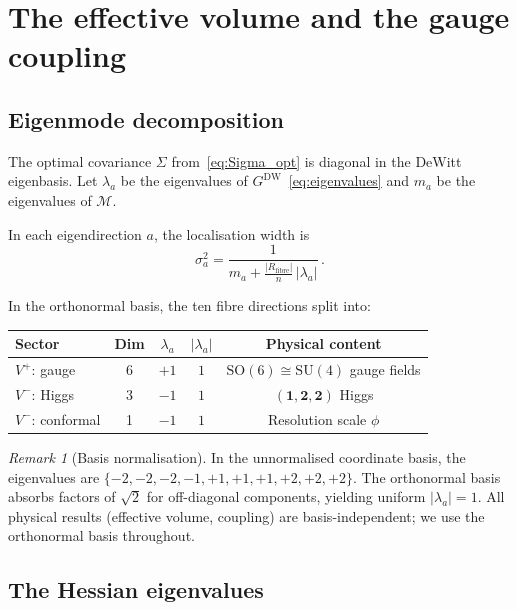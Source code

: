 \documentclass[12pt, a4paper]{article}
\theoremstyle{definition}
\theoremstyle{remark}
\newtheorem{remark}[theorem]{Remark}
\newcommand{\SU}{\mathrm{SU}}
\newcommand{\SO}{\mathrm{SO}}
\newcommand{\Rfibre}{R_{\mathrm{fibre}}}
\begin{document}
\section{The effective volume and the gauge coupling}
\label{sec:coupling}

\subsection{Eigenmode decomposition}

The optimal covariance $\Sigma$ from~\eqref{eq:Sigma_opt} is diagonal in the DeWitt eigenbasis.
Let $\lambda_a$ be the eigenvalues of $G^{\mathrm{DW}}$~\eqref{eq:eigenvalues} and $m_a$ be the eigenvalues of $\mathcal{M}$.

In each eigendirection $a$, the localisation width is
\begin{equation}
\label{eq:sigma_a}
\sigma_a^2 = \frac{1}{m_a + \frac{|\Rfibre|}{n}\, |\lambda_a|}\,.
\end{equation}

In the orthonormal basis, the ten fibre directions split into:
\begin{center}
\renewcommand{\arraystretch}{1.3}
\begin{tabular}{lcccc}
\toprule
\textbf{Sector} & \textbf{Dim} & $\lambda_a$ & $|\lambda_a|$ & \textbf{Physical content} \\
\midrule
$V^+$: gauge & 6 & $+1$ & $1$ & $\SO(6) \cong \SU(4)$ gauge fields \\
$V^-$: Higgs & 3 & $-1$ & $1$ & $(\mathbf{1},\mathbf{2},\mathbf{2})$ Higgs \\
$V^-$: conformal & 1 & $-1$ & $1$ & Resolution scale $\phi$ \\
\bottomrule
\end{tabular}
\end{center}
\begin{remark}[Basis normalisation]
In the unnormalised coordinate basis, the eigenvalues are $\{-2,-2,-2,-1,+1,+1,+1,+2,+2,+2\}$.
The orthonormal basis absorbs factors of $\sqrt{2}$ for off-diagonal components, yielding uniform $|\lambda_a| = 1$.
All physical results (effective volume, coupling) are basis-independent; we use the orthonormal basis throughout.
\end{remark}

\subsection{The Hessian eigenvalues}
\end{document}
